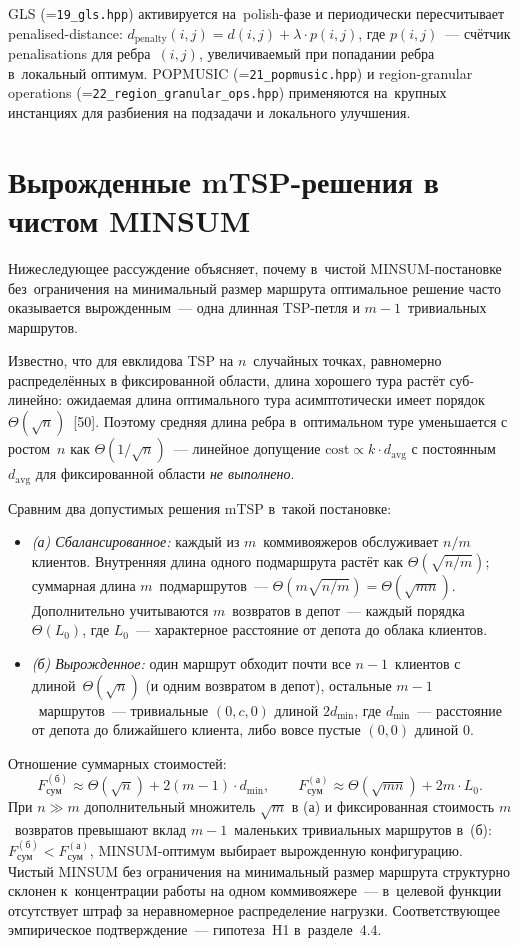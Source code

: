 \documentclass[a4paper,14pt]{extreport}
\makeatletter
\let\old@texttt\texttt
\renewcommand{\texttt}[1]{{\sloppy\hyphenchar\font=\m@ne\old@texttt{#1}}}
\makeatother
\begin{document}
GLS (\texttt{19\_gls.hpp}) активируется на~polish-фазе и периодически пересчитывает penalised-distance: $d_{\text{penalty}}(i, j) = d(i, j) + \lambda \cdot p(i, j)$, где $p(i, j)$~--- счётчик penalisations для ребра~$(i, j)$, увеличиваемый при попадании ребра в~локальный оптимум. POPMUSIC (\texttt{21\_popmusic.hpp}) и region-granular operations (\texttt{22\_region\_granular\_ops.hpp}) применяются на~крупных инстанциях для разбиения на подзадачи и локального улучшения.

\chapter{Вырожденные mTSP-решения в чистом MINSUM}

Нижеследующее рассуждение объясняет, почему в~чистой MINSUM-постановке без~ограничения на минимальный размер маршрута оптимальное решение часто оказывается вырожденным~--- одна длинная TSP-петля и $m{-}1$~тривиальных маршрутов.

Известно, что для евклидова TSP на $n$~случайных точках, равномерно распределённых в фиксированной области, длина хорошего тура растёт суб-линейно: ожидаемая длина оптимального тура асимптотически имеет порядок $\Theta(\sqrt{n})$~[50]. Поэтому средняя длина ребра в~оптимальном туре уменьшается с ростом~$n$ как $\Theta(1/\sqrt{n})$~--- линейное допущение $\mathrm{cost}\propto k\cdot d_{\mathrm{avg}}$ с постоянным $d_{\mathrm{avg}}$ для фиксированной области \emph{не выполнено}.

Сравним два допустимых решения mTSP в~такой постановке:
\begin{itemize}\itemsep1pt
\item \emph{(а) Сбалансированное:} каждый из $m$~коммивояжеров обслуживает $n/m$ клиентов. Внутренняя длина одного подмаршрута растёт как $\Theta(\sqrt{n/m})$; суммарная длина $m$~подмаршрутов~--- $\Theta(m\sqrt{n/m})=\Theta(\sqrt{mn})$. Дополнительно учитываются $m$~возвратов в депот~--- каждый порядка~$\Theta(L_0)$, где $L_0$~--- характерное расстояние от депота до облака клиентов.
\item \emph{(б) Вырожденное:} один маршрут обходит почти все $n{-}1$~клиентов с длиной~$\Theta(\sqrt{n})$ (и одним возвратом в депот), остальные $m{-}1$~маршрутов~--- тривиальные $(0,c,0)$ длиной $2d_{\min}$, где $d_{\min}$~--- расстояние от депота до ближайшего клиента, либо вовсе пустые $(0,0)$ длиной 0.
\end{itemize}
Отношение суммарных стоимостей:
\[
F_\mathrm{сум}^{(\text{б})} \approx \Theta(\sqrt{n}) + 2(m{-}1)\cdot d_{\min}, \qquad
F_\mathrm{сум}^{(\text{а})} \approx \Theta(\sqrt{mn}) + 2 m \cdot L_0.
\]
При $n\gg m$ дополнительный множитель $\sqrt{m}$ в (а) и фиксированная стоимость $m$~возвратов превышают вклад $m{-}1$~маленьких тривиальных маршрутов в~(б): $F_\mathrm{сум}^{(\text{б})}<F_\mathrm{сум}^{(\text{а})}$, MINSUM-оптимум выбирает вырожденную конфигурацию. Чистый MINSUM без ограничения на минимальный размер маршрута структурно склонен к~концентрации работы на одном коммивояжере~--- в~целевой функции отсутствует штраф за неравномерное распределение нагрузки. Соответствующее эмпирическое подтверждение~--- гипотеза~H1 в~разделе~4.4.
\end{document}
